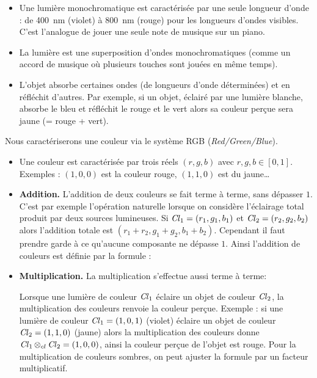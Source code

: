 \documentclass[11pt,class=report,crop=false]{standalone}
\begin{document}
\begin{itemize}
  \item Une lumière monochromatique est caractérisée par une seule longueur d'onde : de \SI{400}{\nano\meter} (violet) à \SI{800}{\nano\meter} (rouge) pour les longueurs d'ondes visibles. C'est l'analogue de jouer une seule note de musique sur un piano.

  \item La lumière est une superposition d'ondes monochromatiques (comme un accord de musique où plusieurs touches sont jouées en même temps).

  \item L'objet absorbe certaines ondes (de longueurs d'onde déterminées) et en réfléchit d'autres. 
  Par exemple, si un objet, éclairé par une lumière blanche, absorbe le bleu et réfléchit le rouge et le vert alors sa couleur perçue sera jaune (= rouge + vert).
\end{itemize}

\medskip

Nous caractériserons une couleur via le système RGB (\emph{Red/Green/Blue}).
\begin{itemize}
  \item Une couleur est caractérisée par trois réels $(r,g,b)$ avec $r,g,b \in [0,1]$.
  Exemples : $(1,0,0)$ est la couleur rouge, $(1,1,0)$ est du jaune\ldots

  \item \textbf{Addition.} 
  L'addition de deux couleurs se fait terme à terme, sans dépasser $1$.
  C'est par exemple l'opération naturelle lorsque on considère l'éclairage total produit par deux sources lumineuses.
  Si $\operatorname{\it Cl}_1 = (r_1,g_1,b_1)$ et $\operatorname{\it Cl}_2 = (r_2,g_2,b_2)$ alors l'addition totale est $(r_1+r_2,g_1+g_2,b_1+b_2)$. Cependant il faut prendre garde à ce qu'aucune composante ne dépasse $1$. Ainsi l'addition de couleurs est définie par la formule :
  
  \smallskip


  \item \textbf{Multiplication.}
  La multiplication s'effectue aussi terme à terme:
  
  \smallskip
  

  Lorsque une lumière de couleur $\operatorname{\it Cl}_1$ éclaire un objet de couleur $\operatorname{\it Cl}_2$, la multiplication des couleurs renvoie la couleur perçue.
  Exemple : si une lumière de couleur $\operatorname{\it Cl}_1 = (1,0,1)$ (violet) éclaire un objet de couleur $\operatorname{\it Cl}_2 = (1,1,0)$ (jaune) alors la multiplication des couleurs donne  
  $\operatorname{\it Cl}_1 \otimes_{cl} \operatorname{\it Cl}_2 = (1,0,0)$, ainsi la couleur perçue de l'objet est rouge.
  Pour la multiplication de couleurs sombres, on peut ajuster la formule par un facteur multiplicatif.
  
\end{itemize}
\end{document}
